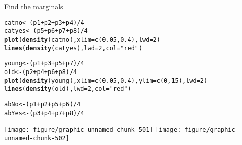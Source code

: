 \documentclass[12pt,letterpaper,oneside]{article}\usepackage{graphicx, color}
\makeatletter
\newcommand{\hlfunctioncall}[1]{\textcolor[rgb]{0.501960784313725,0,0.329411764705882}{\textbf{#1}}}%
\newcommand{\hlstring}[1]{\textcolor[rgb]{0.6,0.6,1}{#1}}%
\newenvironment{kframe}{%
 \def\at@end@of@kframe{}%
 \ifinner\ifhmode%
  \def\at@end@of@kframe{\end{minipage}}%
  \begin{minipage}{\columnwidth}%
 \fi\fi%
 \def\FrameCommand##1{\hskip\@totalleftmargin \hskip-\fboxsep
 \colorbox{shadecolor}{##1}\hskip-\fboxsep
     \hskip-\linewidth \hskip-\@totalleftmargin \hskip\columnwidth}%
 \MakeFramed {\advance\hsize-\width
   \@totalleftmargin\z@ \linewidth\hsize
   \@setminipage}}%
 {\par\unskip\endMakeFramed%
 \at@end@of@kframe}
\newenvironment{knitrout}{}{} %
\makeatother
\begin{document}
Find the marginals
\begin{knitrout}\scriptsize
{}\color{fgcolor}\begin{kframe}
\begin{alltt}
catno <- (p1 + p2 + p3 + p4)/4
catyes <- (p5 + p6 + p7 + p8)/4
\hlfunctioncall{plot}(\hlfunctioncall{density}(catno), xlim = \hlfunctioncall{c}(0.05, 0.4), lwd = 2)
\hlfunctioncall{lines}(\hlfunctioncall{density}(catyes), lwd = 2, col = \hlstring{"red"})

young <- (p1 + p3 + p5 + p7)/4
old <- (p2 + p4 + p6 + p8)/4
\hlfunctioncall{plot}(\hlfunctioncall{density}(young), xlim = \hlfunctioncall{c}(0.05, 0.4), ylim = \hlfunctioncall{c}(0, 15), lwd = 2)
\hlfunctioncall{lines}(\hlfunctioncall{density}(old), lwd = 2, col = \hlstring{"red"})

abNo <- (p1 + p2 + p5 + p6)/4
abYes <- (p3 + p4 + p7 + p8)/4
\end{alltt}
\end{kframe}

{\centering \texttt{[image: figure/graphic-unnamed-chunk-501]} 
\texttt{[image: figure/graphic-unnamed-chunk-502]} 

}



\end{knitrout}
\end{document}
